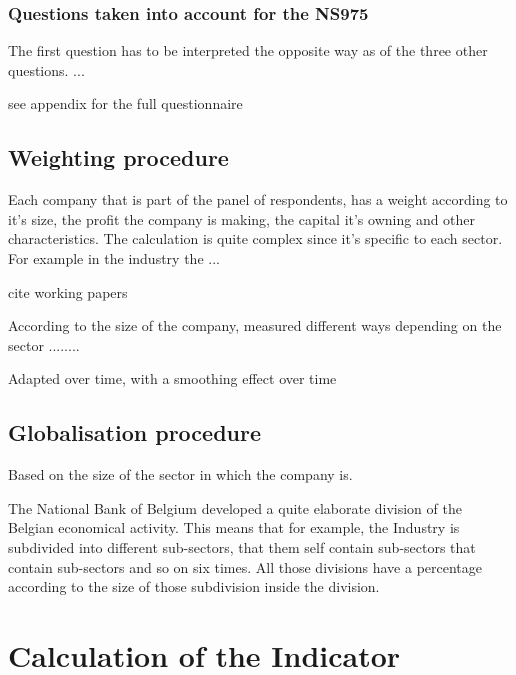 \documentclass[12pt,a4paper,oneside]{book}
\begin{document}
\subsubsection{Questions taken into account for the NS975}


The first question has to be interpreted the opposite way as of the three other questions. ...



see appendix  for the full questionnaire


\subsection{Weighting procedure}
\label{sec:Weighting procedure}

Each company that is part of the panel of respondents, has a weight according to it's size, the profit the company is making, the capital it's owning and other characteristics. The calculation is quite complex since it's specific to each sector. For example in the industry the ...

cite working papers

According to the size of the company, measured different ways depending on the sector ........

Adapted over time, with a smoothing effect over time

\subsection{Globalisation procedure}
\label{sec:Globalisation procedure}


Based on the size of the sector in which the company is.

The National Bank of Belgium developed a quite elaborate division of the Belgian economical activity. This means that for example, the Industry is subdivided into different sub-sectors, that them self contain sub-sectors that contain sub-sectors and so on six times. All those divisions have a percentage according to the size of those subdivision inside the division.



\newpage
\section{Calculation of the Indicator}
\end{document}
